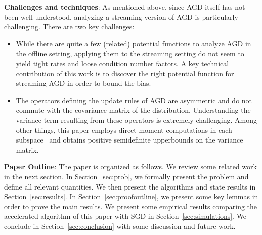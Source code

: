 %

\textbf{Challenges and techniques}:
As mentioned above, since AGD itself has not been well understood, analyzing a streaming version of AGD is particularly challenging. There are two key challenges:
\begin{itemize}
	\item	While there are quite a few (related) potential functions to analyze AGD in the offline setting, applying them to the streaming setting do not seem to yield tight rates and loose condition number factors. A key technical contribution of this work is to discover the right potential function for streaming AGD in order to bound the bias.
	\item	The operators defining the update rules of AGD are asymmetric and do not commute with the covariance matrix of the distribution. Understanding the variance term resulting from these operators is extremely challenging. Among other things, this paper employs direct moment computations in each subspace~\cite{ODonoghueC15} and obtains positive semidefinite upperbounds on the variance matrix.
\end{itemize}  


\FloatBarrier
{\bf Paper Outline}: The paper is organized as follows. We review some related work in the next section. In Section~\ref{sec:prob}, we formally present the problem and define all relevant quantities. We then present the algorithms and state results in Section~\ref{sec:results}. In Section~\ref{sec:proofoutline}, we present some key lemmas in order to prove the main results. We present some empirical results comparing the accelerated algorithm of this paper with SGD in Section~\ref{sec:simulations}. We conclude in Section~\ref{sec:conclusion} with some discussion and future work.